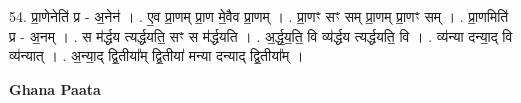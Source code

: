 \documentclass[17pt]{extarticle}
\begin{document}
54. प्रा॒णेनेति॑ प्र - अ॒नेन॑ । . ए॒व प्रा॒णम् प्रा॒ण मे॒वैव प्रा॒णम् । . प्रा॒णꣳ सꣳ सम् प्रा॒णम् प्रा॒णꣳ सम् । . प्रा॒णमिति॑ प्र - अ॒नम् । . स म॑र्द्धय त्यर्द्धयति॒ सꣳ स म॑र्द्धयति । . अ॒र्द्ध॒य॒ति॒ वि व्य॑र्द्धय त्यर्द्धयति॒ वि । . व्य॑न्या दन्या॒द् वि व्य॑न्यात् । . अ॒न्या॒द् द्वि॒तीया᳚म् द्वि॒तीया॑ मन्या दन्याद् द्वि॒तीया᳚म् । \newline

\textbf{Ghana Paata } \newline
\end{document}
